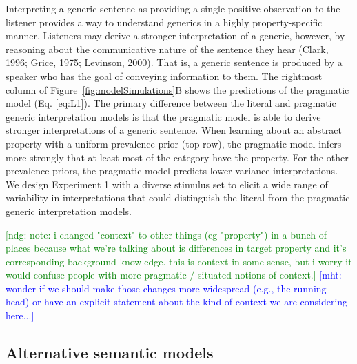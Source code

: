 \documentclass[floatsintext,doc]{apa6}
\begin{document}
Interpreting a generic sentence as providing a single positive observation to the listener provides a way to understand generics in a highly property-specific manner.
Listeners may derive a stronger interpretation of a generic, however, by reasoning about the communicative nature of the sentence they hear (Clark, 1996; Grice, 1975; Levinson, 2000).
That is, a generic sentence is produced by a speaker who has the goal of conveying information to them.
The rightmost column of Figure~\ref{fig:modelSimulations}B shows the predictions of the pragmatic model (Eq. \ref{eq:L1}).
The primary difference between the literal and pragmatic generic interpretation models is that the pragmatic model is able to derive stronger interpretations of a generic sentence.
When learning about an abstract property with a uniform prevalence prior (top row), the pragmatic model infers more strongly that at least most of the category have the property.
For the other prevalence priors, the pragmatic model predicts lower-variance interpretations.
We design Experiment 1 with a diverse stimulus set to elicit a wide range of variability in interpretations that could distinguish the literal from the pragmatic generic interpretation models.

{\textcolor{Green}{[ndg: note: i changed "context" to other things (eg "property") in a bunch of places because what we're talking about is differences in target property and it's corresponding background knowledge. this is context in some sense, but i worry it would confuse people with more pragmatic / situated notions of context.]}}
{\textcolor{Blue}{[mht: wonder if we should make those changes more widespread (e.g., the running-head) or have an explicit statement about the kind of context we are considering here...]}}

\hypertarget{alternative-semantic-models}{%
\subsection{Alternative semantic models}\label{alternative-semantic-models}}
\end{document}
